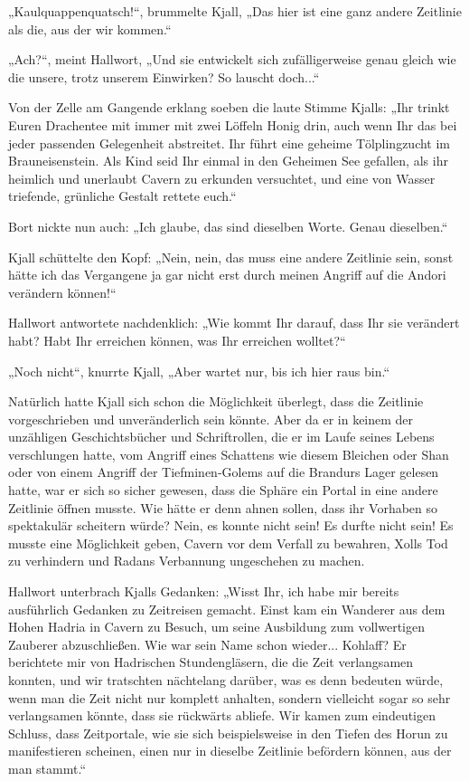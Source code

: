 „Kaulquappenquatsch!“, brummelte Kjall, „Das hier ist eine ganz andere Zeitlinie als die, aus der wir kommen.“

„Ach?“, meint Hallwort, „Und sie entwickelt sich zufälligerweise genau gleich wie die unsere, trotz unserem Einwirken? So lauscht doch...“

Von der Zelle am Gangende erklang soeben die laute Stimme Kjalls: „Ihr trinkt Euren Drachentee mit immer mit zwei Löffeln Honig drin, auch wenn Ihr das bei jeder passenden Gelegenheit abstreitet. Ihr führt eine geheime Tölplingzucht im Brauneisenstein. Als Kind seid Ihr einmal in den Geheimen See gefallen, als ihr heimlich und unerlaubt Cavern zu erkunden versuchtet, und eine von Wasser triefende, grünliche Gestalt rettete euch.“

Bort nickte nun auch: „Ich glaube, das sind dieselben Worte. Genau dieselben.“

Kjall schüttelte den Kopf: „Nein, nein, das muss eine andere Zeitlinie sein, sonst hätte ich das Vergangene ja gar nicht erst durch meinen Angriff auf die Andori verändern können!“

Hallwort antwortete nachdenklich: „Wie kommt Ihr darauf, dass Ihr sie verändert habt? Habt Ihr erreichen können, was Ihr erreichen wolltet?“

„Noch nicht“, knurrte Kjall, „Aber wartet nur, bis ich hier raus bin.“

Natürlich hatte Kjall sich schon die Möglichkeit überlegt, dass die Zeitlinie vorgeschrieben und unveränderlich sein könnte. Aber da er in keinem der unzähligen Geschichtsbücher und Schriftrollen, die er im Laufe seines Lebens verschlungen hatte, vom Angriff eines Schattens wie diesem Bleichen oder Shan oder von einem Angriff der Tiefminen-Golems auf die Brandurs Lager gelesen hatte, war er sich so sicher gewesen, dass die Sphäre ein Portal in eine andere Zeitlinie öffnen musste. Wie hätte er denn ahnen sollen, dass ihr Vorhaben so spektakulär scheitern würde? Nein, es konnte nicht sein! Es durfte nicht sein! Es musste eine Möglichkeit geben, Cavern vor dem Verfall zu bewahren, Xolls Tod zu verhindern und Radans Verbannung ungeschehen zu machen.

Hallwort unterbrach Kjalls Gedanken: „Wisst Ihr, ich habe mir bereits ausführlich Gedanken zu Zeitreisen gemacht. Einst kam ein Wanderer aus dem Hohen Hadria in Cavern zu Besuch, um seine Ausbildung zum vollwertigen Zauberer abzuschließen. Wie war sein Name schon wieder... Kohlaff? Er berichtete mir von Hadrischen Stundengläsern, die die Zeit verlangsamen konnten, und wir tratschten nächtelang darüber, was es denn bedeuten würde, wenn man die Zeit nicht nur komplett anhalten, sondern vielleicht sogar so sehr verlangsamen könnte, dass sie rückwärts abliefe. Wir kamen zum eindeutigen Schluss, dass Zeitportale, wie sie sich beispielsweise in den Tiefen des Horun zu manifestieren scheinen, einen nur in dieselbe Zeitlinie befördern können, aus der man stammt.“


